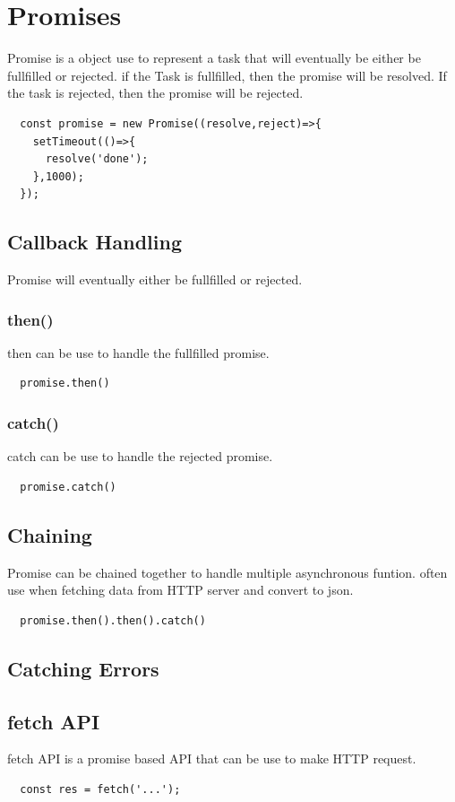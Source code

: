\documentclass[11pt,a4paper,onecolumn]{IEEEtran}
\begin{document}
\section{Promises}
Promise is a object use to represent a task that will eventually be either be fullfilled or rejected. 
if the Task is fullfilled, then the promise will be resolved. If the task is rejected, then the promise will be rejected.
\begin{lstlisting}
  const promise = new Promise((resolve,reject)=>{
    setTimeout(()=>{
      resolve('done');
    },1000);
  });
\end{lstlisting}
\subsection{Callback Handling} 
Promise will eventually either be fullfilled or rejected. 

\subsubsection{then()}
then can be use to handle the fullfilled promise.
\begin{lstlisting}
  promise.then()
\end{lstlisting}

\subsubsection{catch()}
catch can be use to handle the rejected promise.
\begin{lstlisting}
  promise.catch()
\end{lstlisting}

\subsection{Chaining}
Promise can be chained together to handle multiple asynchronous funtion. often use when fetching data from HTTP server and convert to json.
\begin{lstlisting}
  promise.then().then().catch()
\end{lstlisting}
\subsection{Catching Errors}
\subsection{fetch API}
fetch API is a promise based API that can be use to make HTTP request. 
\begin{lstlisting}
  const res = fetch('...');
\end{lstlisting}
\end{document}
